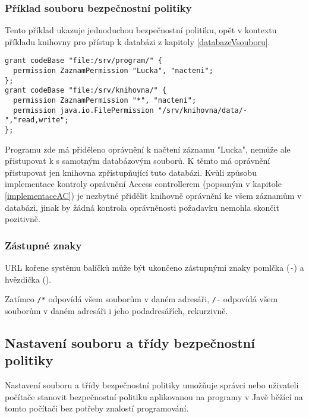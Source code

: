 \subsubsection{Příklad souboru bezpečnostní politiky}

Tento příklad ukazuje jednoduchou bezpečnostní politiku, opět v kontextu příkladu knihovny pro přístup k databázi z kapitoly \ref{databazeVsouboru}.

\begin{verbatim}
grant codeBase "file:/srv/program/" {
  permission ZaznamPermission "Lucka", "nacteni";
};
grant codeBase "file:/srv/knihovna/" {
  permission ZaznamPermission "*", "nacteni";
  permission java.io.FilePermission "/srv/knihovna/data/-","read,write";
};
\end{verbatim}

Programu zde má přiděleno oprávnění k načtení záznamu "Lucka", nemůže ale přistupovat k s samotným databázovým souborů. K těmto má oprávnění přistupovat jen knihovna zpřístupňující tuto databázi. Kvůli způsobu implementace kontroly oprávnění Access controllerem (popsaným v kapitole \ref{implementaceAC}) je nezbytné přidělit knihovně oprávnění ke všem záznamům v databázi, jinak by žádná kontrola oprávněnosti požadavku nemohla skončit pozitivně.

\subsubsection{Zástupné znaky}

URL kořene systému balíčků může být ukončeno zástupnými znaky pomlčka ({\tt -}) a hvězdička ({\tt *}).

Zatímco {\tt /*} odpovídá všem souborům v daném adresáři, {\tt /-} odpovídá všem souborům v daném adresáři i jeho podadresářích, rekurzivně.
\cite{jdkdocPolicyFiles}

\subsection{Nastavení souboru a třídy bezpečnostní politiky}

Nastavení souboru a třídy bezpečnostní politiky umožňuje správci nebo uživateli počítače stanovit bezpečnostní politiku aplikovanou na programy v Javě běžící na tomto počítači bez potřeby znalostí programování.

